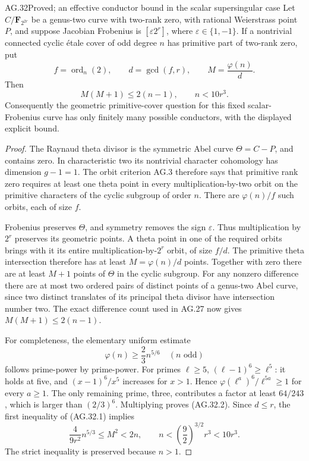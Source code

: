 \begin{claim}{AG.32}{Proved; an effective conductor bound in the scalar supersingular case}
Let $C/\mathbf F_{2^{2r}}$ be a genus-two curve with two-rank zero,
with rational Weierstrass point $P$, and suppose Jacobian Frobenius
is $[\varepsilon2^r]$, where $\varepsilon\in\{1,-1\}$.
If a nontrivial connected cyclic \'etale cover of odd degree $n$
has primitive part of two-rank zero, put
\[
 f=\operatorname{ord}_n(2),\qquad d=\gcd(f,r),\qquad
 M=\frac{\varphi(n)}d.
\]
Then
\[
             M(M+1)\le 2(n-1),\qquad n<10r^3.       \tag{AG.32.1}
\]
Consequently the geometric primitive-cover question for this
fixed scalar-Frobenius curve has only finitely many possible
conductors, with the displayed explicit bound.
\end{claim}
\begin{proof}
The Raynaud theta divisor is the symmetric Abel curve
$\Theta=C-P$, and contains zero. In characteristic two its
nontrivial character cohomology has dimension $g-1=1$.
The orbit criterion AG.3 therefore says that primitive
rank zero requires at least one theta point in every
multiplication-by-two orbit on the primitive characters
of the cyclic subgroup of order $n$.
There are $\varphi(n)/f$ such orbits, each of size $f$.

Frobenius preserves $\Theta$, and symmetry removes the sign
$\varepsilon$. Thus multiplication by $2^r$ preserves its
geometric points. A theta point in one of the required
orbits brings with it its entire multiplication-by-$2^r$
orbit, of size $f/d$. The primitive theta intersection
therefore has at least $M=\varphi(n)/d$ points.
Together with zero there are at least $M+1$ points of
$\Theta$ in the cyclic subgroup. For any nonzero difference
there are at most two ordered pairs of distinct points of
a genus-two Abel curve, since two distinct translates of
its principal theta divisor have intersection number two.
The exact difference count used in AG.27 now gives
$M(M+1)\le2(n-1)$.

For completeness, the elementary uniform estimate
\[
                  \varphi(n)\ge\frac23 n^{5/6}
                       \quad(n\text{ odd})             \tag{AG.32.2}
\]
follows prime-power by prime-power. For primes $\ell\ge5$,
$(\ell-1)^6\ge\ell^5$: it holds at five, and
$(x-1)^6/x^5$ increases for $x>1$. Hence
$\varphi(\ell^a)^6/\ell^{5a}\ge1$ for every $a\ge1$.
The only remaining prime, three, contributes a factor at
least $64/243$, which is larger than $(2/3)^6$.
Multiplying proves (AG.32.2). Since $d\le r$, the first
inequality of (AG.32.1) implies
\[
 \frac{4}{9r^2}n^{5/3}\le M^2<2n,
 \qquad
 n<\left(\frac92\right)^{3/2}r^3<10r^3.
\]
The strict inequality is preserved because $n>1$.
\end{proof}

